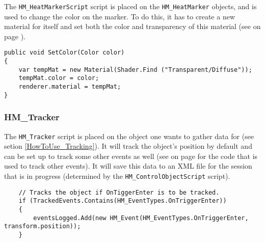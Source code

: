 The \texttt{HM\_HeatMarkerScript} script is placed on the \texttt{HM\_HeatMarker} objects, and is used to change the color on the marker. To do this, it has to create a new material for itself and set both the color and transparency of this material (see  on page \pageref{code:OFS_03}).

\begin{lstlisting}
public void SetColor(Color color)
{
	var tempMat = new Material(Shader.Find ("Transparent/Diffuse"));
	tempMat.color = color;
	renderer.material = tempMat;
}
\end{lstlisting}

\subsubsection*{HM\_Tracker}

The \texttt{HM\_Tracker} script is placed on the object one wants to gather data for (see setion \ref{HowToUse_Tracking}). It will track the object's position by default and can be set up to track some other events as well (see  on page \pageref{code:OFS_04} for the code that is used to track other events). It will save this data to an XML file for the session that is in progress (determined by the \texttt{HM\_ControlObjectScript} script).

\begin{lstlisting}
	// Tracks the object if OnTiggerEnter is to be tracked.
	if (TrackedEvents.Contains(HM_EventTypes.OnTriggerEnter))
	{
		eventsLogged.Add(new HM_Event(HM_EventTypes.OnTriggerEnter, transform.position));
	}
\end{lstlisting}

